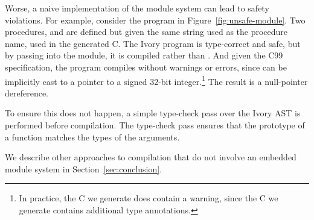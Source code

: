 Worse, a naive implementation of the module system can lead to safety
violations. For example, consider the program in
Figure~\ref{fig:unsafe-module}. Two procedures,  and 
are defined but given the same string used as the procedure name, used in the
generated C. The Ivory program is type-correct and safe, but by passing
 into the module, it is compiled rather than . And given
the C99 specification, the program compiles without warnings or errors, since
 can be implicitly cast to a pointer to a signed 32-bit
integer.\footnote{In practice, the C we generate does contain a warning, since
  the C we generate contains additional type annotations.} The result is a
null-pointer dereference.

To ensure this does not happen, a simple type-check pass over the Ivory AST is
performed before compilation. The type-check pass ensures that the prototype of
a function matches the types of the arguments.

We describe other approaches to compilation that do not involve an embedded
module system in Section~\ref{sec:conclusion}.








